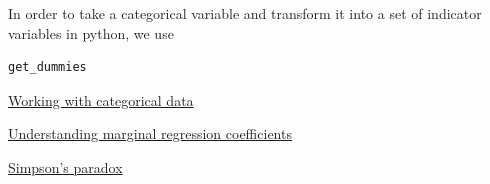 In order to take a categorical variable and transform it into a set of indicator variables in python, we use 
\begin{Verbatim}
get_dummies
\end{Verbatim}


\begin{example}
\href{https://colab.research.google.com/drive/1oIRgP_7-c5DGV1D2iz5nj406mZfJxUIG#scrollTo=wbeO1TS8os5J&line=15&uniqifier=1}{Working with categorical data}
\end{example}


\begin{exercise}
\href{https://colab.research.google.com/drive/1oIRgP_7-c5DGV1D2iz5nj406mZfJxUIG#scrollTo=wbeO1TS8os5J&line=15&uniqifier=1}{Understanding marginal regression coefficients}
\end{exercise}



\begin{exercise}
\href{https://colab.research.google.com/drive/1oIRgP_7-c5DGV1D2iz5nj406mZfJxUIG#scrollTo=wbeO1TS8os5J&line=15&uniqifier=1}{Simpson's paradox}
\end{exercise}

